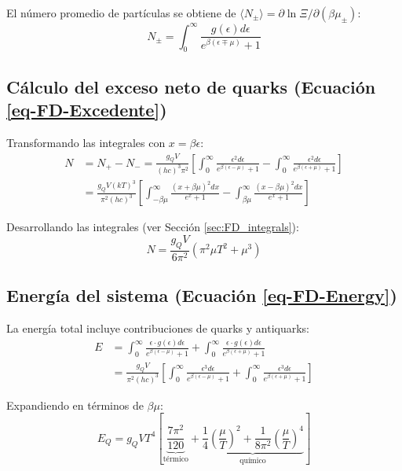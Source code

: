 El número promedio de partículas se obtiene de $\langle N_\pm \rangle = \partial \ln \Xi / \partial (\beta \mu_\pm)$:
\begin{equation}
N_\pm = \int_0^\infty \frac{g(\epsilon) d\epsilon}{e^{\beta(\epsilon \mp \mu)} + 1}
\end{equation}

\subsection{Cálculo del exceso neto de quarks (Ecuación \ref{eq-FD-Excedente})}
Transformando las integrales con $x = \beta \epsilon$:
\begin{align}
N &= N_+ - N_- = \frac{g_Q V}{(hc)^3 \pi^2} \left[ \int_0^\infty \frac{\epsilon^2 d\epsilon}{e^{\beta(\epsilon-\mu)} + 1} - \int_0^\infty \frac{\epsilon^2 d\epsilon}{e^{\beta(\epsilon+\mu)} + 1} \right] \nonumber \\
&= \frac{g_Q V (kT)^3}{\pi^2 (hc)^3} \left[ \int_{-\beta\mu}^\infty \frac{(x + \beta\mu)^2 dx}{e^x + 1} - \int_{\beta\mu}^\infty \frac{(x - \beta\mu)^2 dx}{e^x + 1} \right]
\end{align}

Desarrollando las integrales (ver Sección \ref{sec:FD_integrals}):
\begin{equation}
N = \frac{g_Q V}{6\pi^2} \left( \pi^2 \mu T^2 + \mu^3 \right)
\end{equation}

\subsection{Energía del sistema (Ecuación \ref{eq-FD-Energy})}
La energía total incluye contribuciones de quarks y antiquarks:
\begin{align}
E &= \int_0^\infty \frac{\epsilon \cdot g(\epsilon) d\epsilon}{e^{\beta(\epsilon-\mu)} + 1} + \int_0^\infty \frac{\epsilon \cdot g(\epsilon) d\epsilon}{e^{\beta(\epsilon+\mu)} + 1} \nonumber \\
&= \frac{g_Q V}{\pi^2 (hc)^3} \left[ \int_0^\infty \frac{\epsilon^3 d\epsilon}{e^{\beta(\epsilon-\mu)} + 1} + \int_0^\infty \frac{\epsilon^3 d\epsilon}{e^{\beta(\epsilon+\mu)} + 1} \right]
\end{align}

Expandiendo en términos de $\beta\mu$:
\begin{equation}
E_Q = g_Q V T^4 \left[ \underbrace{\frac{7\pi^2}{120}}_{\text{térmico}} + \underbrace{\frac{1}{4}\left(\frac{\mu}{T}\right)^2 + \frac{1}{8\pi^2}\left(\frac{\mu}{T}\right)^4}_{\text{químico}} \right]
\end{equation}

